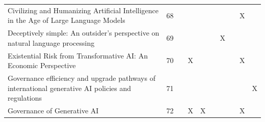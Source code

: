 \begin{landscape}
\begin{longtable}{|p{14cm}|c|c|c|c|c|c|c|c|c|}
		Civilizing and Humanizing Artificial Intelligence in the Age of Large Language Models                                                                   & 68          &                                    &                                                           &                                                       &                                                            &                                           &                                              & X                                                  &                                    \\
		Deceptively simple: An outsider's perspective on natural language processing                                                                            & 69          &                                    &                                                           &                                                       &                                                            & X                                         &                                              &                                                    &                                    \\
		Existential Risk from Transformative AI: An Economic Perspective                                                                                        & 70          &                                    & X                                                         &                                                       &                                                            &                                           &                                              & X                                                  &                                    \\
		Governance efficiency and upgrade pathways of international generative AI policies and regulations                                                      & 71          &                                    &                                                           &                                                       &                                                            &                                           &                                              &                                                    & X                                  \\
		Governance of Generative AI                                                                                                                             & 72          &                                    & X                                                         & X                                                     &                                                            &                                           &                                              & X                                                  &                                    \\

\end{longtable}
\end{landscape}
